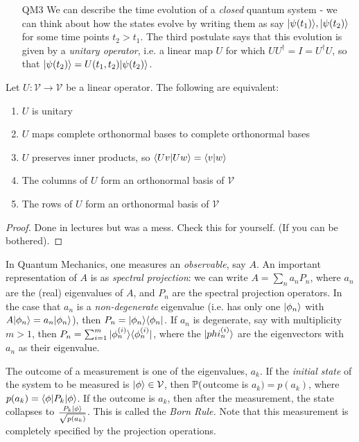 \documentclass[10pt,a4paper]{article}
\begin{document}
\begin{itemize}
\item[QM3] We can describe the time evolution of a \emph{closed} quantum system - we can think about how the states evolve by writing them as say $\ket{\psi(t_1)}, \ket{\psi(t_2)}$ for some time points $t_2 > t_1$. The third postulate says that this evolution is given by a \emph{unitary operator}, i.e. a linear map $U$ for which $UU^{\dag} = I = U^{\dag}U$, so that $\ket{\psi(t_2)} = U(t_1,t_2)\ket{\psi(t_2)}$.
\end{itemize}
\begin{proposition}
Let $U:\mathcal{V}\to \mathcal{V}$ be a linear operator. The following are equivalent:
\begin{enumerate}
\item $U$ is unitary
\item $U$ maps complete orthonormal bases to complete orthonormal bases
\item $U$ preserves inner products, so $\braket{Uv}{Uw} = \braket{v}{w}$
\item The columns of $U$ form an orthonormal basis of $\mathcal{V}$
\item The rows of $U$ form an orthonormal basis of $\mathcal{V}$
\end{enumerate}
\end{proposition}
\begin{proof}
Done in lectures but was a mess. Check this for yourself. (If you can be bothered).
\end{proof}

In Quantum Mechanics, one measures an \emph{observable}, say $A$. An important representation of $A$ is as \emph{spectral projection}: we can write $A = \sum_{n} a_n P_n$, where $a_n$ are the (real) eigenvalues of $A$, and $P_n$ are the spectral projection operators. In the case that $a_n$ is a \emph{non-degenerate} eigenvalue (i.e. has only one $\ket{\phi_n}$ with $A\ket{\phi_n} = a_n\ket{\phi_n}$), then $P_n = \ket{\phi_n}\bra{\phi_n}$. If $a_n$ is degenerate, say with  multiplicity $m > 1$, then  $P_n = \sum_{i=1}^m \ket{\phi_n^{(i)}}\bra{\phi_n^{(i)}}$, where the $\ket{phi_n^{(i)}}$ are the eigenvectors with $a_n$ as their eigenvalue.

The outcome of a measurement is one of the eigenvalues, $a_k$. If the \emph{initial state} of the system to be measured is $\ket{\phi} \in \mathcal{V}$, then $\P($outcome is $a_k) = p(a_k)$, where $p(a_k) = \bra{\phi}P_k\ket{\phi}$. If the outcome is $a_k$, then after the measurement, the state collapses to $\frac{P_k\ket{\phi}}{\sqrt{p(a_k)}}$. This is called the \emph{Born Rule.} Note that this measurement is completely specified by the projection operations. 
\end{document}
